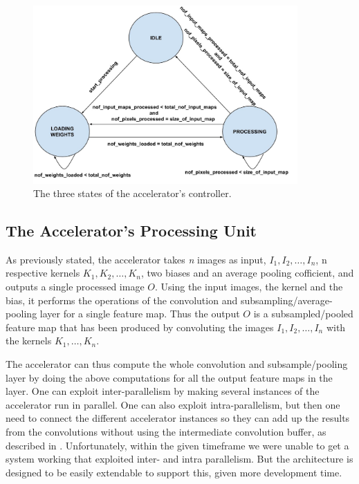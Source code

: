 \begin{figure}[h!]
  \centering
      \includegraphics[width=0.9\textwidth]{Figures/Method/accelerator_state_machine}
    \caption{The three states of the accelerator's controller.}
    \label{fig_accelerator_state_machine}
\end{figure}

  
\subsection{The Accelerator's Processing Unit}

As previously stated, the accelerator takes \textit{n} images as input, $ I_1, I_2, \dots, I_n $, n respective kernels $ K_1, K_2, \dots, K_n $, two biases and an average pooling cofficient, and outputs a single processed image $ O $. Using the input images, the kernel and the bias, it performs the operations of the convolution and subsampling/average-pooling layer for a single feature map. Thus the output $ O $ is a subsampled/pooled feature map that has been produced by convoluting the images $ I_1, I_2, \dots, I_n $ with the kernels $ K_1, \dots, K_n $. 

The accelerator can thus compute the whole convolution and subsample/pooling layer by doing the above computations for all the output feature maps in the layer. One can exploit inter-parallelism by making several instances of the accelerator run in parallel. One can also exploit intra-parallelism, but then one need to connect the different accelerator instances so they can add up the results from the convolutions without using the intermediate convolution buffer, as described in \cite{Chakradhar2010}. Unfortunately, within the given timeframe we were unable to get a system working that exploited inter- and intra parallelism. But the architecture is designed to be easily extendable to support this, given more development time. 


